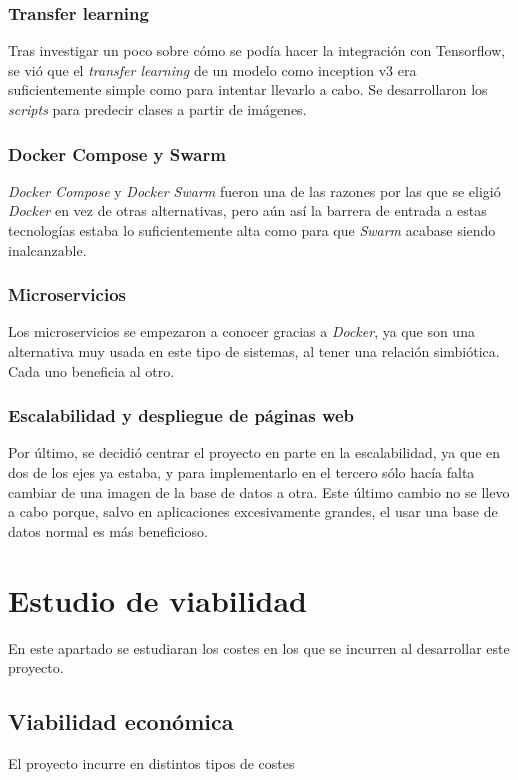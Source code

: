 \subsubsection{Transfer learning}
Tras investigar un poco sobre cómo se podía hacer la integración con Tensorflow, se vió que el \emph{transfer learning} de un modelo como inception v3 era suficientemente simple como para intentar llevarlo a cabo.
Se desarrollaron los \emph{scripts} para predecir clases a partir de imágenes.

\subsubsection{Docker Compose y Swarm}
\emph{Docker Compose} y \emph{Docker Swarm} fueron una de las razones por las que se eligió \emph{Docker} en vez de otras alternativas, pero aún así la barrera de entrada a estas tecnologías estaba lo suficientemente alta como para que \emph{Swarm} acabase siendo inalcanzable. \cite{orchdock}

\subsubsection{Microservicios}
Los microservicios se empezaron a conocer gracias a \emph{Docker}, ya que son una alternativa muy usada en este tipo de sistemas, al tener una relación simbiótica. Cada uno beneficia al otro.

\subsubsection{Escalabilidad y despliegue de páginas web}
Por último, se decidió centrar el proyecto en parte en la escalabilidad, ya que en dos de los ejes ya estaba, y para implementarlo en el tercero sólo hacía falta cambiar de una imagen de la base de datos a otra. Este último cambio no se llevo a cabo porque, salvo en aplicaciones excesivamente grandes, el usar una base de datos normal es más beneficioso.

\section{Estudio de viabilidad}
En este apartado se estudiaran los costes en los que se incurren al desarrollar este proyecto.

\subsection{Viabilidad económica}
El proyecto incurre en distintos tipos de costes

